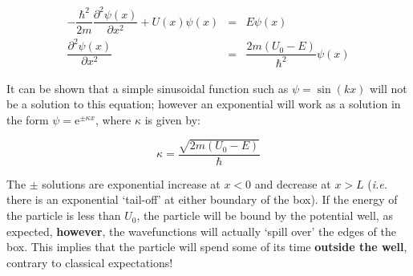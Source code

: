 \documentclass[
]{book}
\begin{document}
\begin{equation}
\begin{array}{rcl}
-\dfrac{\hbar^2}{2m} \dfrac{\partial^2 \psi(x)}{\partial x^2} + U(x) \psi(x) &=&  E \psi(x)\\
\dfrac{\partial^2 \psi(x)}{\partial x^2} &=& \dfrac{2m (U_0 - E)}{\hbar^2} \psi(x)
\end{array}
\label{eq:ch18-finitewell1}
\end{equation}

It can be shown that a simple sinusoidal function such as \(\psi = \sin(kx)\) will not be a solution to this equation; however an exponential will work as a solution in the form \(\psi = \mathrm{e}^{\pm \kappa x}\), where \(\kappa\) is given by:

\begin{equation}
\kappa = \frac{\sqrt{2m(U_0 - E)}}{\hbar}
\end{equation}

The \(\pm\) solutions are exponential increase at \(x<0\) and decrease at \(x>L\) (\emph{i.e.} there is an exponential `tail-off' at either boundary of the box). If the energy of the particle is less than \(U_0\), the particle will be bound by the potential well, as expected, \textbf{however}, the wavefunctions will actually `spill over' the edges of the box. This implies that the particle will spend some of its time \textbf{outside the well}, contrary to classical expectations!
\end{document}
